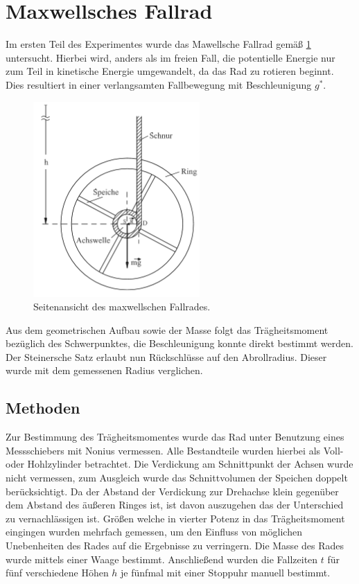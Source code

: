 \section{Maxwellsches Fallrad}



Im ersten Teil des Experimentes wurde das Mawellsche Fallrad gemäß \cref{fig:fallrad} untersucht. Hierbei wird, anders als im freien Fall, die potentielle Energie nur zum Teil in kinetische Energie umgewandelt, da das Rad zu rotieren beginnt. Dies resultiert in einer verlangsamten Fallbewegung mit Beschleunigung $g^*$. \\

\begin{figure}[h] %
	\centering
	\includegraphics[width=0.5\linewidth]{res/Fallrad}
	\caption{Seitenansicht des maxwellschen Fallrades.\cite{lw}}
	\label{fig:fallrad}
\end{figure}


Aus dem geometrischen Aufbau sowie der Masse folgt das Trägheitsmoment bezüglich des Schwerpunktes, die Beschleunigung konnte direkt bestimmt werden. Der Steinersche Satz erlaubt nun Rückschlüsse auf den Abrollradius. Dieser wurde mit dem gemessenen Radius verglichen.






\subsection{Methoden}
Zur Bestimmung des Trägheitsmomentes wurde das Rad unter Benutzung eines Messschiebers mit Nonius vermessen. Alle Bestandteile wurden hierbei als Voll- oder Hohlzylinder betrachtet. Die Verdickung am Schnittpunkt der Achsen wurde nicht vermessen, zum Ausgleich wurde das Schnittvolumen der Speichen doppelt berücksichtigt. Da der Abstand der Verdickung zur Drehachse klein gegenüber dem Abstand des äußeren Ringes ist, ist davon auszugehen das der Unterschied zu vernachlässigen ist. Größen welche in vierter Potenz in das Trägheitsmoment eingingen wurden mehrfach gemessen, um den Einfluss von möglichen Unebenheiten des Rades auf die Ergebnisse zu verringern. Die Masse des Rades wurde mittels einer Waage bestimmt.
Anschließend wurden die Fallzeiten $t$ für fünf verschiedene Höhen $h$ je fünfmal mit einer Stoppuhr manuell bestimmt.



